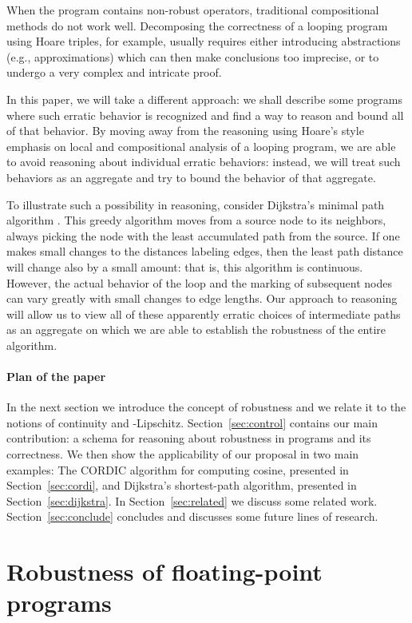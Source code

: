 \documentclass[copyright,creativecommons]{eptcs}
\begin{document}
When the program contains non-robust operators, traditional
compositional methods do not work well. Decomposing the
correctness of a looping program using Hoare triples, for example,
usually requires either introducing abstractions (e.g., approximations)
which can then make conclusions too imprecise, or to undergo a very
complex and intricate proof.

In this paper, we will take a different approach: we shall describe
some programs where such erratic behavior is recognized and find a way
to reason and bound all of that behavior.  By moving away from the
reasoning using Hoare's style emphasis on local and compositional
analysis of a looping program, we are able to avoid reasoning about
individual erratic behaviors: instead, we will treat such behaviors as
an aggregate and try to bound the behavior of that aggregate.

To illustrate such a possibility in reasoning, consider Dijkstra's
minimal path algorithm \cite{dijkstra59}.  This greedy algorithm moves
from a source node to its neighbors, always picking the node with the
least accumulated path from the source.  If one makes small changes to
the distances labeling edges, then the least path distance will change
also by a small amount: that is, this algorithm is continuous.
However, the actual behavior of the loop and the marking of subsequent
nodes can vary greatly with small changes to edge lengths.  Our
approach to reasoning will allow us to view all of these apparently
erratic choices of intermediate paths as an aggregate on which we are
able to establish the robustness of the entire algorithm.



\paragraph{Plan of the paper}
In the next section we introduce the concept of robustness and we
relate it to the notions of continuity and -Lipschitz.
Section~\ref{sec:control} contains our main contribution: a schema for
reasoning about robustness in programs 
and its correctness. We then show the applicability of our proposal in
two main examples: The CORDIC algorithm for computing cosine,
presented in Section~\ref{sec:cordi}, and Dijkstra's shortest-path
algorithm, presented in Section~\ref{sec:dijkstra}.  In
Section~\ref{sec:related} we discuss some related
work. Section~\ref{sec:conclude} concludes and discusses some future
lines of research.


\section{Robustness of floating-point programs}
\end{document}
